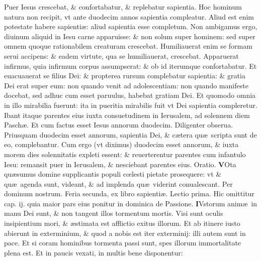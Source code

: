 \documentclass[a5paper,10pt]{book}
\def\rightmarginnote{%
	\lrmarginnote{\hskip\columnwidth \hskip -1em}}
\def\ae{æ}
\def\oe{œ}
\begin{document}
\begin{multicols*}{2}
\newline \color{red} P\color{black}uer Iesus crescebat, \& confortabatur, \& replebatur sapientia. Hoc hominum natura non recipit, vt ante duodecim annos sapientia compleatur.
Aliud est enim potestate habere sapienti\ae : aliud sapientia esse completum. Non ambigamus ergo, diuinum aliquid in Iesu carne apparuisse: \& non solum super hominem: sed super omnem quoque rationabilem creaturam crescebat.
Humiliauerat enim se formam serui accipens: \& eadem virtute, qua se humiliauerat, crescebat.
Apparuerat infirmus, quia infirmum corpus assumpserat: \& ob id iterumque confortabatur.
Et euacuauerat se filius Dei: \& propterea rursum complebatur sapientia: \& gratia Dei erat super eum: non quando venit ad adolescentiam: non quando manifeste docebat, sed adhuc cum esset paruulus, habebat gratiam Dei.
Et quomodo omnia in illo mirabilia fuerunt: ita in pueritia mirabilis fuit vt Dei sapientia compleretur.
Ibant itaque parentes eius iuxta consuetudinem in Ierusalem, ad solennem diem Pasch\ae . Et cum factus esset Iesus annorum duodecim.
Diligenter obserua. Priusquam duodecim esset annorum, sapientia Dei, \& c\ae tera qu\ae \ scripta sunt de eo, complebantur.
Cum ergo (vt diximus) duodecim esset annorum, \& iuxta morem dies solennitatis expleti essent: \& reuerterentur parentes cum infantulo Iesu: remansit puer in Ierusalem, \& nesciebant parentes eius. \color{red} Oratio. \color{black}
\vspace{-.25em}
\lettrine[lines=2]{\bfseries \color{red} V}{}Ota qu\ae sumus domine supplicantis populi c\oe lesti pietate prosequere: vt \& qu\ae \ agenda sunt, videant, \& ad implenda qu\ae \ viderint conualescant. Per dominum nostrum.
\newline {} \color{red} \hypertarget{MON-TERTIA-POST-ADV}{Feria secunda,} ex libro sapienti\ae . Lectio prima. Hic omittitur cap. ij. quia maior pars eius ponitur in dominica de Passione. \color{black}
\vspace{-.25em}
\lettrine[lines=2]{\bfseries I}{}\textdagger Vstorum\rightmarginnote{ca. 3.\\a} anim\ae \ in manu Dei sunt, \& non tangent illos tormentum mortis.
Visi sunt oculis insipientium mori, \& \ae stimata est afflictio exitus illorum. Et ab itinere iusto abierunt in exterminium, \& quod a nobis est iter exterminij: illi autem sunt in pace.%
Et si coram hominibus tormenta passi sunt, spes illorum immortalitate plena est. Et in paucis vexati, in multis bene disponentur:

\end{multicols*}
\end{document}
